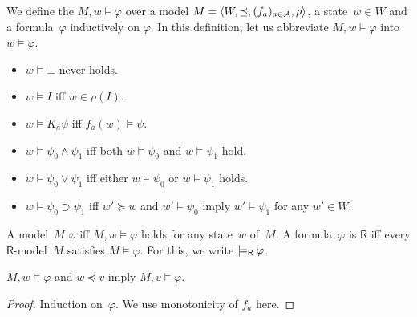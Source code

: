  \begin{definition}
   We define the  $M,w\models\varphi$ over a model
   $M = \langle{W,\preceq,(f_a)_{a\in \mathcal A},\rho}\rangle$, a state~$w\in W$ and a
   formula~$\varphi$ inductively on $\varphi$.
   In this definition, let
   us abbreviate $M,w\models \varphi$ into $w\models \varphi$\enspace.
   \newcommand{\m}{}
   \begin{itemize}
    \item $w\models \bot$ never holds.
    \item $w\models I$ iff
	  $w \in
	  \rho(I)$.
    \item	    $w\models K_a \psi$ iff
		    $f_a(w)\models \psi$.
    \item $w\models \psi_0\land\psi_1$ iff both
	  $w\models \psi_0$ and $w\models \psi_1$ hold.
    \item
	 $ w\models \psi_0\vee\psi_1$ iff either
	 $ w\models \psi_0$ or $w\models \psi_1$ holds.
    \item
	 $w\models \psi_0\supset\psi_1$ iff
	 $w'\succeq w$ and $w'\models \psi_0$ imply
	 $w'\models\psi_1$ for any $w'\in W$\enspace.
   \end{itemize}
  \end{definition}
  A model~$M$  $\varphi$ iff $M,w\models\varphi$ holds for any
  state~$w$ of~$M$.
  A formula~$\varphi$ is  $\mathsf R$ iff
  every $\mathsf R$-model~$M$ satisfies $M\models \varphi$.
  For this, we write $\models_{\mathsf R} \varphi$\enspace.

  \begin{lemma}
   \label{monot}
   $M,w\models\varphi$ and $w\preceq v$ imply
   $M,v\models\varphi$.
  \end{lemma}
  \begin{proof}
   Induction on~$\varphi$.
   We use monotonicity of $f_a$ here.
  \end{proof}

